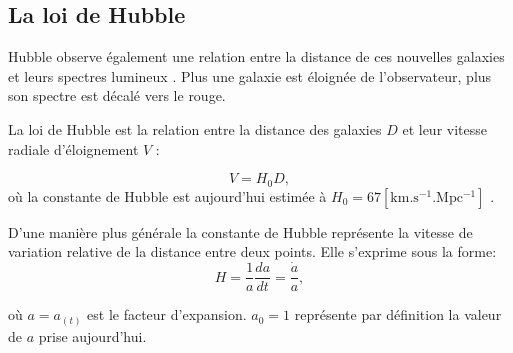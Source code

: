 \subsection{La loi de Hubble}
Hubble observe également une relation entre la distance de ces nouvelles galaxies et leurs spectres lumineux \citep{1929CoMtW...3...23H}.
Plus une galaxie est éloignée de l'observateur, plus son spectre est décalé vers le rouge.
%

La loi de Hubble est la relation entre la distance des galaxies $D$ et leur vitesse radiale d'éloignement $V$ : %

\begin{equation}
V = H_0 D,
\end{equation}
où la constante de Hubble est aujourd'hui estimée à $H_0 = 67 \mathrm{ \left[ km.s^{-1}.Mpc^{-1} \right ] }$ \citep{planck_collaboration_planck_2016}.

D'une manière plus générale la constante de Hubble représente la vitesse de variation relative de la distance entre deux points.
Elle s'exprime sous la forme:
\begin{equation}
H=\frac{1}{a} \frac{da}{dt} = \frac{\dot{a}}{a},
\end{equation}

où $a = a_{(t)}$ est le facteur d'expansion.
$a_0=1$ représente par définition la valeur de $a$ prise aujourd'hui.

